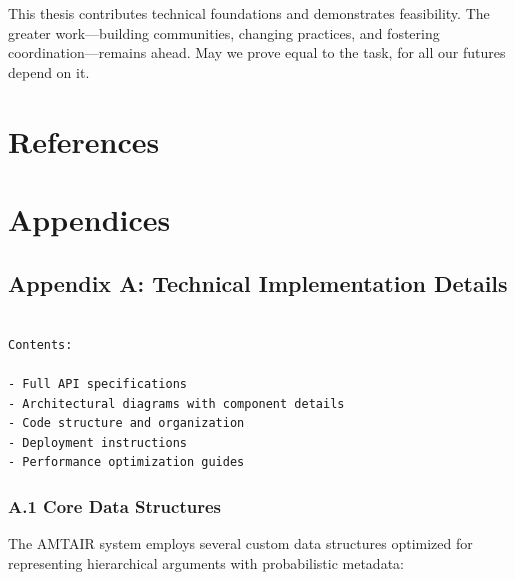 \documentclass[
  11pt,
  letterpaper,
]{book}
\begin{document}
This thesis contributes technical foundations and demonstrates
feasibility. The greater work---building communities, changing
practices, and fostering coordination---remains ahead. May we prove
equal to the task, for all our futures depend on it.


\chapter*{References}\label{sec-references}


\printbibliography[heading=none]


\chapter*{Appendices}\label{sec-appendices}


\section*{Appendix A: Technical Implementation
Details}\label{sec-appendix-technical}


\begin{verbatim}

Contents:

- Full API specifications
- Architectural diagrams with component details
- Code structure and organization
- Deployment instructions
- Performance optimization guides
\end{verbatim}

\subsection*{A.1 Core Data Structures}\label{sec-data-structures}

The AMTAIR system employs several custom data structures optimized for
representing hierarchical arguments with probabilistic metadata:
\end{document}
